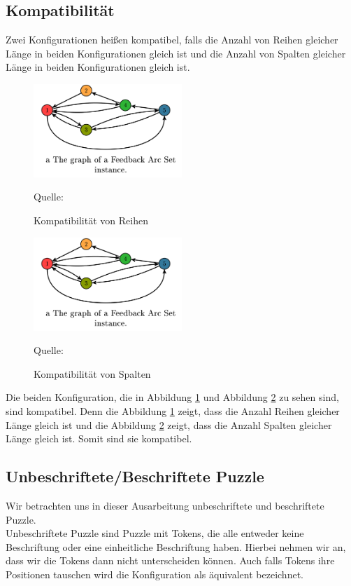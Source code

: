\documentclass[seminar,german]{algothesis}
\newcommand*{\quelle}{%
  \footnotesize Quelle:
}
\begin{document}
\subsection{Kompatibilität}
\begin{definition}
Zwei Konfigurationen heißen kompatibel, falls die Anzahl von Reihen gleicher Länge in beiden Konfigurationen gleich ist und die Anzahl von Spalten gleicher Länge in beiden Konfigurationen gleich ist.
\end{definition}
\begin{figure}[ht]
	\centering
	\includegraphics[width=0.5\textwidth]{graph}
	\caption{Kompatibilität von Reihen}
	\quelle \cite{akitaya2022pushing}
	\label{fig:5.1}
\end{figure}
\begin{figure}[ht]
	\centering
	\includegraphics[width=0.5\textwidth]{graph}
	\caption{Kompatibilität von Spalten}
	\quelle \cite{akitaya2022pushing}
	\label{fig:5.2}
\end{figure}

\noindent Die beiden Konfiguration, die in Abbildung \ref{fig:5.1} und Abbildung \ref{fig:5.2} zu sehen sind, sind kompatibel. Denn die Abbildung \ref{fig:5.1} zeigt, dass die Anzahl Reihen gleicher Länge gleich ist und die Abbildung \ref{fig:5.2} zeigt, dass die Anzahl Spalten gleicher Länge gleich ist. Somit sind sie kompatibel.

\subsection{Unbeschriftete/Beschriftete Puzzle}
Wir betrachten uns in dieser Ausarbeitung unbeschriftete und beschriftete Puzzle.\\ Unbeschriftete Puzzle sind Puzzle mit Tokens, die alle entweder keine Beschriftung oder eine einheitliche Beschriftung haben. Hierbei nehmen wir an, dass wir die Tokens dann nicht unterscheiden können. Auch falls Tokens ihre Positionen tauschen wird die Konfiguration als äquivalent bezeichnet. 
\end{document}
